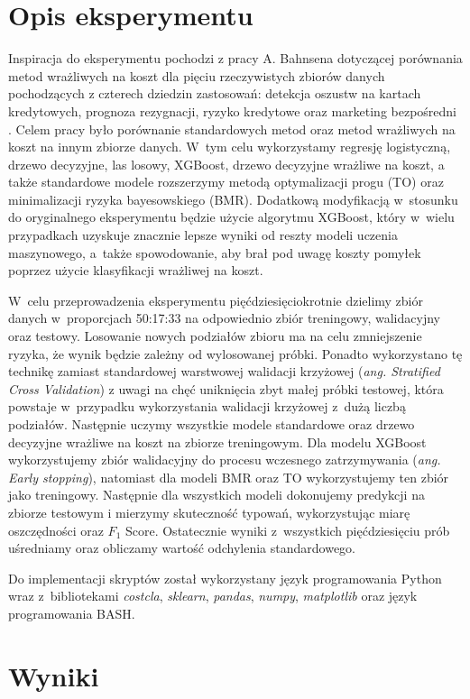 \documentclass[inzynierska]{pwr_wmat_praca_dyplomowa}
\theoremstyle{plain}
\numberwithin{theorem}{chapter}
\theoremstyle{definition}
\numberwithin{theorem}{chapter}
\begin{document}
\section{Opis eksperymentu}
Inspiracja do eksperymentu pochodzi z pracy A. Bahnsena dotyczącej porównania metod wrażliwych na koszt dla pięciu rzeczywistych zbiorów danych pochodzących z czterech dziedzin zastosowań: detekcja oszustw na kartach kredytowych, prognoza rezygnacji, ryzyko kredytowe oraz marketing bezpośredni \cite{alej2015ensemble}. Celem pracy było porównanie standardowych metod oraz metod wrażliwych na koszt na innym zbiorze danych. W~tym celu wykorzystamy regresję logistyczną, drzewo decyzyjne, las losowy, XGBoost, drzewo decyzyjne wrażliwe na koszt, a także standardowe modele rozszerzymy metodą optymalizacji progu (TO) oraz minimalizacji ryzyka bayesowskiego (BMR). Dodatkową modyfikacją w~stosunku do oryginalnego eksperymentu będzie użycie algorytmu XGBoost, który w~wielu przypadkach uzyskuje znacznie lepsze wyniki od reszty modeli uczenia maszynowego, a~także spowodowanie, aby brał pod uwagę koszty pomyłek poprzez użycie klasyfikacji wrażliwej na koszt.

W~celu przeprowadzenia eksperymentu pięćdziesięciokrotnie dzielimy zbiór danych w~proporcjach 50:17:33 na odpowiednio zbiór treningowy, walidacyjny oraz testowy. Losowanie nowych podziałów zbioru ma na celu zmniejszenie ryzyka, że wynik będzie zależny od wylosowanej próbki. Ponadto wykorzystano tę technikę zamiast standardowej warstwowej walidacji krzyżowej (\textit{ang. Stratified Cross Validation}) z uwagi na chęć uniknięcia zbyt małej próbki testowej, która powstaje w~przypadku wykorzystania walidacji krzyżowej z~dużą liczbą podziałów. Następnie uczymy wszystkie modele standardowe oraz drzewo decyzyjne wrażliwe na koszt na zbiorze treningowym. Dla modelu XGBoost wykorzystujemy zbiór walidacyjny do procesu wczesnego zatrzymywania (\textit{ang. Early stopping}), natomiast dla modeli BMR oraz TO wykorzystujemy ten zbiór jako treningowy. Następnie dla wszystkich modeli dokonujemy predykcji na zbiorze testowym i mierzymy skuteczność typowań, wykorzystując miarę oszczędności oraz $F_1$ Score. Ostatecznie wyniki z~wszystkich pięćdziesięciu prób uśredniamy oraz obliczamy wartość odchylenia standardowego.

Do implementacji skryptów został wykorzystany język programowania Python wraz z~bibliotekami \textit{costcla}, \textit{sklearn}, \textit{pandas}, \textit{numpy}, \textit{matplotlib} oraz język programowania BASH.

\section{Wyniki}
\end{document}
